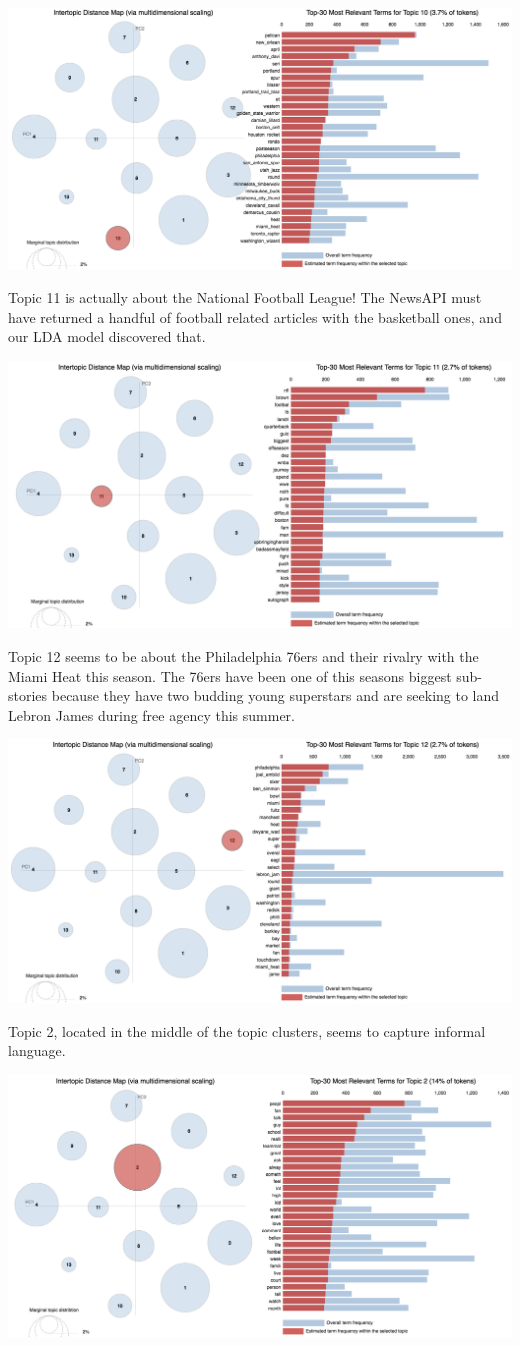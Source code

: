 \documentclass[11pt]{article}
\begin{document}
\includegraphics[width=470pt]{10.png} 

Topic 11 is actually about the National Football League!  The NewsAPI must have returned a handful of football related articles with the basketball ones, and our LDA model discovered that. 

\includegraphics[width=470pt]{11.png} 

Topic 12 seems to be about the Philadelphia 76ers and their rivalry with the Miami Heat this season. The 76ers have been one of this seasons biggest sub-stories because they have two budding young superstars and are seeking to land Lebron James during free agency this summer.

\includegraphics[width=470pt]{12.png} 

Topic 2, located in the middle of the topic clusters, seems to capture informal language. 

\includegraphics[width=470pt]{2.png} 
\end{document}

